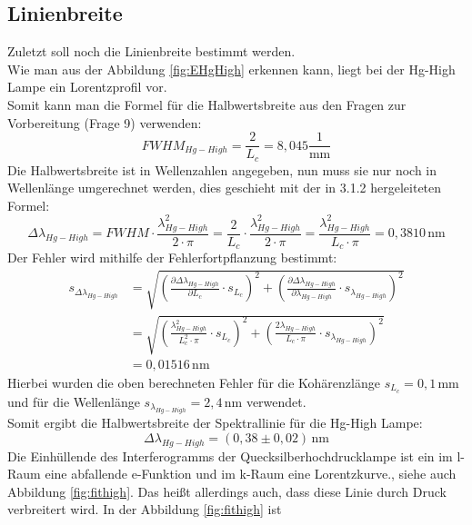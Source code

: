\subsection{Linienbreite}
Zuletzt soll noch die Linienbreite bestimmt werden.\\
Wie man aus der Abbildung \ref{fig:EHgHigh} erkennen kann, liegt bei der Hg-High Lampe ein Lorentzprofil vor.\\
Somit kann man die Formel für die Halbwertsbreite aus den Fragen zur Vorbereitung (Frage 9) verwenden:
\begin{equation}
    FWHM_{Hg-High} = \frac{2}{L_c} = 8,045 \frac{1}{\text{mm}}
\end{equation}
Die Halbwertsbreite ist in Wellenzahlen angegeben, nun muss sie nur noch in Wellenlänge umgerechnet werden, dies 
geschieht mit der in 3.1.2 hergeleiteten Formel:
\begin{equation}
    \Delta \lambda_{Hg-High} = FWHM \cdot \frac{\lambda^2_{Hg-High}}{2 \cdot \pi} = \frac{2}{L_c} \cdot \frac{\lambda^2_{Hg-High}}{2 \cdot \pi} = \frac{\lambda^2_{Hg-High}}{L_c \cdot \pi} = 0,3810\,\text{nm}
\end{equation}
Der Fehler wird mithilfe der Fehlerfortpflanzung bestimmt:
\begin{align}
    s_{\Delta \lambda_{Hg-High}} &= \sqrt{\left(\frac{\partial \Delta \lambda_{Hg-High}}{\partial L_c} \cdot s_{L_c}\right)^2+\left(\frac{\partial \Delta \lambda_{Hg-High}}{\partial \lambda_{Hg-High}} \cdot s_{\lambda_{Hg-High}}\right)^2} \\
    &= \sqrt{\left(\frac{\lambda^2_{Hg-High}}{L_c^2 \cdot \pi} \cdot s_{L_c}\right)^2+\left(\frac{2\lambda_{Hg-High}}{L_c \cdot \pi} \cdot s_{\lambda_{Hg-High}}\right)^2} \\
    & = 0,01516\,\text{nm}
\end{align}
Hierbei wurden die oben berechneten Fehler für die Kohärenzlänge $s_{L_c}=0,1$\,mm und für die Wellenlänge $s_{\lambda_{Hg-High}}=2,4$\,nm verwendet.\\
Somit ergibt die Halbwertsbreite der Spektrallinie für die Hg-High Lampe:
\begin{equation}
    \Delta \lambda_{Hg-High} = (0,38 \pm 0,02)\,\text{nm}
\end{equation}
Die Einhüllende des Interferogramms der Quecksilberhochdrucklampe ist ein im l-Raum eine abfallende e-Funktion und im k-Raum 
eine Lorentzkurve., siehe auch Abbildung \ref{fig:fithigh}. Das 
heißt allerdings auch, dass diese Linie durch Druck verbreitert wird. In der Abbildung \ref{fig:fithigh} ist 
